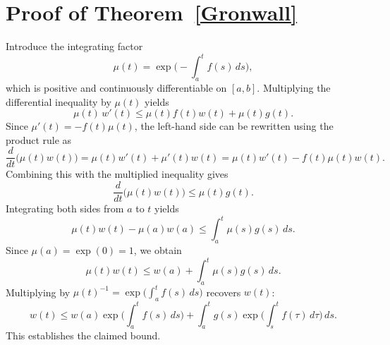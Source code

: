 \documentclass[preprint,12pt]{elsarticle}
\begin{document}
\section{Proof of Theorem~\ref{Gronwall}}\label{app:Gronwall}
Introduce the integrating factor
\[
\mu(t) = \exp\!\Big(-\int_a^t f(s)\,ds\Big),
\]
which is positive and continuously differentiable on \([a,b]\). Multiplying the differential inequality by \(\mu(t)\) yields
\[
\mu(t)\,w'(t) \le \mu(t) f(t) w(t) + \mu(t) g(t).
\]
Since \(\mu'(t) = -f(t)\mu(t)\), the left-hand side can be rewritten using the product rule as
\[
\frac{d}{dt}\big(\mu(t) w(t)\big)= \mu(t) w'(t) + \mu'(t) w(t)= \mu(t) w'(t) - f(t)\mu(t) w(t).
\]
Combining this with the multiplied inequality gives
\[
\frac{d}{dt}\big(\mu(t) w(t)\big) \le \mu(t) g(t).
\]
Integrating both sides from \(a\) to \(t\) yields
\[
\mu(t) w(t) - \mu(a) w(a) \le \int_a^t \mu(s) g(s)\,ds.
\]
Since \(\mu(a)=\exp(0)=1\), we obtain
\[
\mu(t) w(t) \le w(a) + \int_a^t \mu(s) g(s)\,ds.
\]
Multiplying by \(\mu(t)^{-1}=\exp\!\big(\int_a^t f(s)\,ds\big)\) recovers \(w(t)\):
\[
w(t) \le w(a)\exp\!\Big(\int_a^t f(s)\,ds\Big)
+ \int_a^t g(s)\exp\!\Big(\int_s^t f(\tau)\,d\tau\Big)\,ds.
\]
This establishes the claimed bound.

                       
\end{document}
